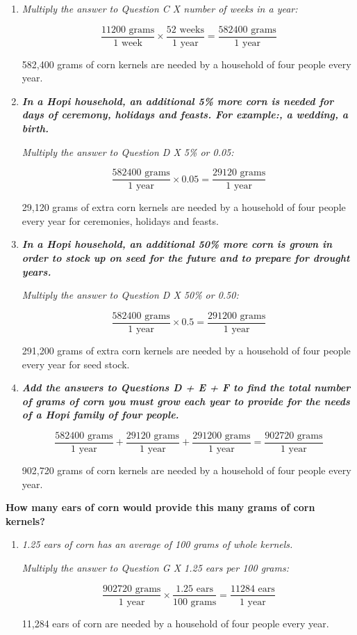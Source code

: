 \documentclass[12pt,]{article}
\begin{document}
\begin{enumerate}
\def\labelenumi{\Alph{enumi}.}
\setcounter{enumi}{3}
\item
  \emph{Multiply the answer to Question C X number of weeks in a year:}

  \[\frac{11200\text{ grams}}{1\text{ week}}\times\frac{52\text{ weeks}}{1\text{ year}}=\frac{582400\text{ grams}}{1 \text{ year}}\]

  582,400 grams of corn kernels are needed by a household of four people every year.
\item
  \textbf{\emph{In a Hopi household, an additional 5\% more corn is needed for days of {ceremony, holidays and feasts}. For example:, a wedding, a birth.}}

  \emph{Multiply the answer to Question D X 5\% or 0.05:}

  \[\frac{582400\text{ grams}}{1\text{ year}}\times0.05=\frac{29120\text{ grams}}{1 \text{ year}}\]

  29,120 grams of extra corn kernels are needed by a household of four people every year for ceremonies, holidays and feasts.
\item
  \textbf{\emph{In a Hopi household, an additional 50\% more corn is grown in order to stock up on {seed for the future} and to prepare for drought years.}}

  \emph{Multiply the answer to Question D X 50\% or 0.50:}

  \[\frac{582400\text{ grams}}{1\text{ year}}\times0.5=\frac{291200 \text{ grams}}{1 \text{ year}}\]

  291,200 grams of extra corn kernels are needed by a household of four people every year for seed stock.
\item
  \textbf{\emph{Add the answers to Questions D + E + F to find the total number of grams of corn you must grow each year to provide for the needs of a Hopi family of four people.}}

  \[\frac{582400\text{ grams}}{1\text{ year}}+\frac{29120\text{ grams}}{1\text{ year}}+\frac{291200\text{ grams}}{1\text{ year}}=\frac{902720 \text{ grams}}{1 \text{ year}}\]

  902,720 grams of corn kernels are needed by a household of four people every year.
\end{enumerate}

\textbf{How many {ears of corn} would provide this many grams of corn kernels?}

\begin{enumerate}
\def\labelenumi{\Alph{enumi}.}
\setcounter{enumi}{7}
\item
  \emph{1.25 ears of corn has an average of 100 grams of whole kernels.}

  \emph{Multiply the answer to Question G X 1.25 ears per 100 grams:}

  \[\frac{902720\text{ grams}}{1\text{ year}}\times\frac{1.25\text{ ears}}{100\text{ grams}}=\frac{11284\text{ ears}}{1 \text{ year}}\]

  11,284 ears of corn are needed by a household of four people every year.
\end{enumerate}
\end{document}
